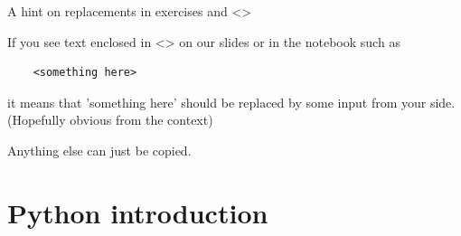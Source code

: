 \begin{frame}[fragile]{A hint on replacements in exercises and <>}

	If you see text enclosed in <> on our slides or in the notebook such as
	\begin{verbatim}
	<something here>
	\end{verbatim}
	it means that 'something here' should be replaced by some input from your side. (Hopefully obvious from the context)

	Anything else can just be copied.

\end{frame}



\section{Python introduction}


